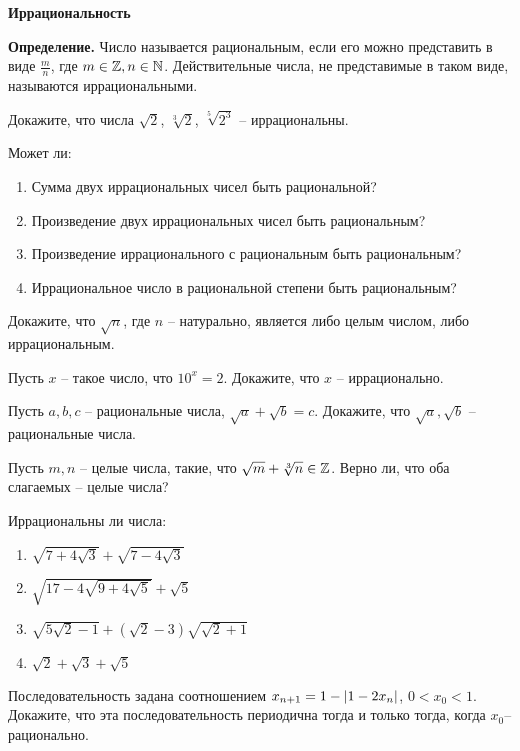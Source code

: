 \documentclass{article}
\begin{document}
    \large

    \begin{center}
        \textbf{Иррациональность}
    \end{center}

    \textbf{Определение.}
    Число называется рациональным, если его можно представить в виде $\frac{m}{n}$, где $m \in \mathbb{Z}, n \in \mathbb{N}$.
    Действительные числа, не представимые в таком виде, называются иррациональными.
    \begin{enumerate_boxed}

        \item Докажите, что числа $\sqrt{2}$, $\sqrt[3]{2}$, $\sqrt[5]{2^3}$ – иррациональны.

        \item Может ли:
        \begin{enumerate}
            \item Сумма двух иррациональных чисел быть рациональной?
            \item Произведение двух иррациональных чисел быть рациональным?
            \item Произведение иррационального с рациональным быть рациональным?
            \item Иррациональное число в рациональной степени быть рациональным?
        \end{enumerate}

        \item Докажите, что $\sqrt{n}$, где $n$ – натурально, является либо целым числом, либо иррациональным.

        \item Пусть $x$ – такое число, что $10^x = 2.$ Докажите, что $x$ – иррационально.

        \item Пусть $a, b, c$ – рациональные числа, $\sqrt{a} + \sqrt{b} = c$.
        Докажите, что $\sqrt{a}, \sqrt{b}$ – рациональные числа.

        \item Пусть $m, n$ – целые числа, такие, что $\sqrt{m} + \sqrt[3]{n} \in \mathbb{Z}$.
        Верно ли, что оба слагаемых – целые числа?

        \item Иррациональны ли числа:
        \begin{enumerate}
            \item $\sqrt{7 + 4\sqrt{3}} + \sqrt{7 - 4\sqrt{3}}$
            \item $\sqrt{17 - 4\sqrt{9 + 4\sqrt{5}}} + \sqrt{5}$
            \item $\sqrt{5\sqrt{2} - 1} + \left(\sqrt{2} - 3\right)\sqrt{\sqrt{2} + 1}$
            \item $\sqrt{2} + \sqrt{3} + \sqrt{5}$
        \end{enumerate}

        \item Последовательность задана соотношением $x_{n + 1} = 1 - \lvert1 - 2x_{n}\rvert$, $0 < x_0 < 1$.
        Докажите, что эта последовательность периодична тогда и только тогда, когда $x_0$– рационально.

    \end{enumerate_boxed}
\end{document}
